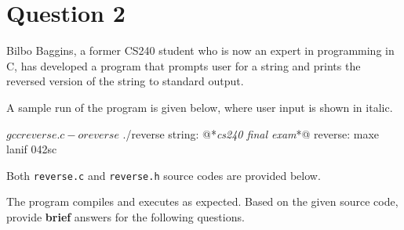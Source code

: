 
\section*{Question 2}

Bilbo Baggins, a former CS240 student who is now an expert in programming in C, has developed a program that prompts user for a string and prints the reversed version of the string to standard output.

A sample run of the program is given below, where user input is shown in italic.

\begin{terminal}
$ gcc reverse.c -o reverse
$ ./reverse
string: @*\textit{cs240 final exam}*@
reverse: maxe lanif 042sc
\end{terminal}

Both \texttt{reverse.c} and \texttt{reverse.h} source codes are provided below.

\lstset{language=c,tabsize=4}



The program compiles and executes as expected.
Based on the given source code, provide \textbf{brief} answers for the following questions.

